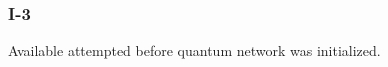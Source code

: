 \subsubsection{I-3}\label{sec:error_code_i_3}

Available attempted before quantum network was initialized.

